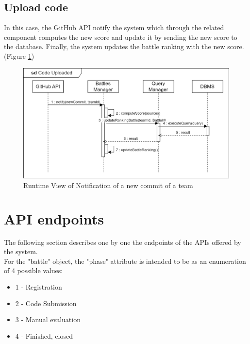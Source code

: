 \newpage
\subsection{Upload code}
In this case, the GitHub API notify the system which through the related component computes the new score and update it by sending the new score to the database. Finally, the system updates the battle ranking with the new score. (Figure \ref{fig:RuntimeView_CodeUploaded})
\begin{figure}[H]
    \centering
    \includegraphics[width=\textwidth]{images/runtimeviews/RuntimeView_CodeUploaded.png}
    \caption{Runtime View of Notification of a new commit of a team}
    \label{fig:RuntimeView_CodeUploaded}
\end{figure}

\newpage
\section{API endpoints}

\lstset{
    basicstyle=\ttfamily\footnotesize,
    showstringspaces=false,
    tabsize=2,
    breaklines=true
}

The following section describes one by one the endpoints of the APIs offered by the system.\\
For the "battle" object, the "phase" attribute is intended to be as an enumeration of 4 possible values:
\begin{itemize}
    \item 1 - Registration
    \item 2 - Code Submission
    \item 3 - Manual evaluation
    \item 4 - Finished, closed
\end{itemize}

